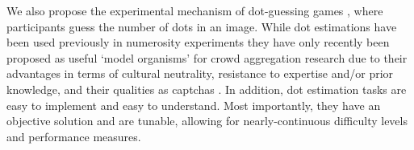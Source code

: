 \documentclass[9pt,twocolumn,twoside,lineno]{pnas-new}
\begin{document}
We also propose the experimental mechanism of dot-guessing games \cite{horton2010dot}, where participants guess the number of dots in an image. While dot estimations have been used previously in numerosity experiments \cite{minturn1951effect, indow1977scaling, krueger1982single} they have only recently been proposed as useful ‘model organisms’ for crowd aggregation research \cite{horton2010dot, ugander2015wisdom} due to their advantages in terms of cultural neutrality, resistance to expertise and/or prior knowledge, and their qualities as captchas \cite{von2008recaptcha}. In addition, dot estimation tasks are easy to implement and easy to understand. Most importantly, they have an objective solution and are tunable, allowing for nearly-continuous difficulty levels and performance measures.


\end{document}
